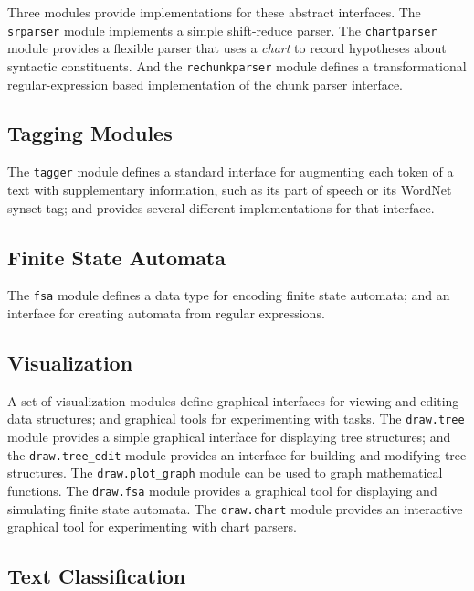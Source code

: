 \documentclass[11pt]{article}
\begin{document}
Three modules provide implementations for these abstract interfaces.
The \texttt{srparser} module implements a simple shift-reduce parser.
The \texttt{chartparser} module provides a flexible parser that uses a
\emph{chart} to record hypotheses about syntactic constituents.  And
the \texttt{rechunkparser} module defines a transformational
regular-expression based implementation of the chunk parser interface.

\subsection*{Tagging Modules}

The \texttt{tagger} module defines a standard interface for augmenting
each token of a text with supplementary information, such as its part
of speech or its WordNet synset tag; and provides several
different implementations for that interface.

\subsection*{Finite State Automata}

The \texttt{fsa} module defines a data type for encoding finite state
automata; and an interface for creating automata from
regular expressions.

\subsection*{Visualization}

A set of visualization modules define graphical interfaces for viewing
and editing data structures; and graphical tools for experimenting
with tasks.  The \texttt{draw.tree} module provides a
simple graphical interface for displaying tree structures; and the
\texttt{draw.tree\_edit} module provides an interface for building and
modifying tree structures.  The \texttt{draw.plot\_graph} module can be
used to graph mathematical functions.  The \texttt{draw.fsa} module
provides a graphical tool for displaying and simulating finite state
automata.  The \texttt{draw.chart} module provides an interactive
graphical tool for experimenting with chart parsers.

\subsection*{Text Classification}
\end{document}
